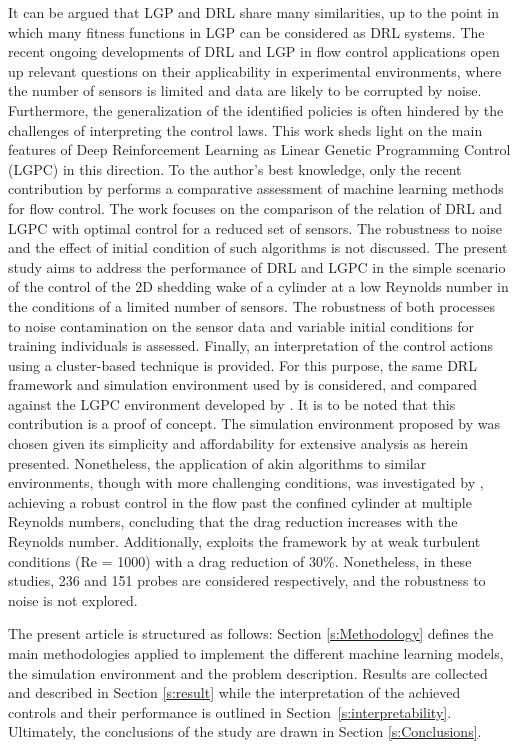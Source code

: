 It can be argued that LGP and DRL share many similarities, up to the point in which many fitness functions in LGP can be considered as DRL systems\citep{banzhaf1998genetic}. The recent ongoing developments of DRL and LGP in flow control applications open up relevant questions on their applicability in experimental environments, where the number of sensors is limited and data are likely to be corrupted by noise. Furthermore, the generalization of the identified policies is often hindered by the challenges of interpreting the control laws. This work sheds light on the main features of Deep Reinforcement Learning as Linear Genetic Programming Control (LGPC) in this direction. To the author's best knowledge, only the recent contribution by \citet{pino2022comparative} performs a comparative assessment of machine learning methods for flow control. The work focuses on the comparison of the relation of DRL and LGPC with optimal control for a reduced set of sensors. The robustness to noise and the effect of initial condition of such algorithms is not discussed. The present study aims to address the performance of DRL and LGPC in the simple scenario of the control of the 2D shedding wake of a cylinder at a low Reynolds number in the conditions of a limited number of sensors. The robustness of both processes to noise contamination on the sensor data and variable initial conditions for training individuals is assessed. Finally, an interpretation of the control actions using a cluster-based technique is provided. For this purpose, the same DRL framework and simulation environment used by \citet{rabault2019DRL} is considered, and compared against the LGPC environment developed by \citet{li2017GP}.
It is to be noted that this contribution is a proof of concept. The simulation environment proposed by \citet{rabault2019DRL} was chosen given its simplicity and affordability for extensive analysis as herein presented. Nonetheless, the application of akin algorithms to similar environments, though with more challenging conditions, was investigated by \citet{Tang2020pof}, achieving a robust control in the flow past the confined cylinder at multiple Reynolds numbers, concluding that the drag reduction increases with the Reynolds number. Additionally, \citet{Ren2021pof} exploits the framework by \citet{rabault2019DRL} at weak turbulent conditions (Re = 1000) with a drag reduction of 30\%. Nonetheless, in these studies, 236 and 151 probes are considered respectively, and the robustness to noise is not explored.

The present article is structured as follows: Section \ref{s:Methodology} defines the main methodologies applied to implement the different machine learning models, the simulation environment and the problem description. Results are collected and described in Section \ref{s:result} while the interpretation of the achieved controls and their performance is outlined in Section~\ref{s:interpretability}. Ultimately, the conclusions of the study are drawn in Section \ref{s:Conclusions}.

